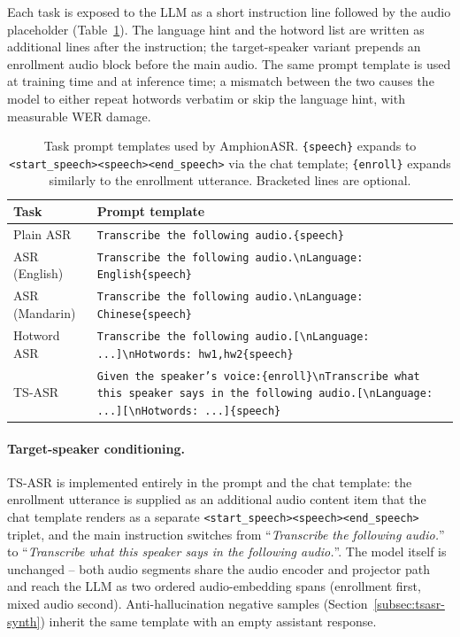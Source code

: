 Each task is exposed to the LLM as a short instruction line followed
by the audio placeholder (Table~\ref{tab:tasks}). The language hint
and the hotword list are written as additional lines after the
instruction; the target-speaker variant prepends an enrollment audio
block before the main audio. The same prompt template is used at
training time and at inference time; a mismatch between the two
causes the model to either repeat hotwords verbatim or skip the
language hint, with measurable WER damage.

\begin{table}[t]
  \caption{Task prompt templates used by AmphionASR. \texttt{\{speech\}}
    expands to \texttt{<start\_speech><speech><end\_speech>} via the
    chat template; \texttt{\{enroll\}} expands similarly to the
    enrollment utterance. Bracketed lines are optional.}
  \label{tab:tasks}
  \centering
  \small
  \setlength{\tabcolsep}{4pt}
  \begin{tabular}{lp{9.6cm}}
    \toprule
    Task & Prompt template \\
    \midrule
    Plain ASR        & \texttt{Transcribe the following audio.\{speech\}} \\
    ASR (English)    & \texttt{Transcribe the following audio.\textbackslash nLanguage: English\{speech\}} \\
    ASR (Mandarin)   & \texttt{Transcribe the following audio.\textbackslash nLanguage: Chinese\{speech\}} \\
    Hotword ASR      & \texttt{Transcribe the following audio.[\textbackslash nLanguage: ...]\textbackslash nHotwords:\,hw1,hw2\{speech\}} \\
    TS-ASR           & \texttt{Given the speaker's voice:\{enroll\}\textbackslash nTranscribe what this speaker says in the following audio.[\textbackslash nLanguage: ...][\textbackslash nHotwords: ...]\{speech\}} \\
    \bottomrule
  \end{tabular}
\end{table}

\paragraph{Target-speaker conditioning.}
TS-ASR is implemented entirely in the prompt and the chat template:
the enrollment utterance is supplied as an additional audio content
item that the chat template renders as a separate
\verb|<start_speech><speech><end_speech>| triplet, and the main
instruction switches from ``\textit{Transcribe the following
audio.}'' to ``\textit{Transcribe what this speaker says in the
following audio.}''. The model itself is unchanged -- both audio
segments share the audio encoder and projector path and reach the
LLM as two ordered audio-embedding spans (enrollment first, mixed
audio second). Anti-hallucination negative samples
(Section~\ref{subsec:tsasr-synth}) inherit the same template with an
empty assistant response.

